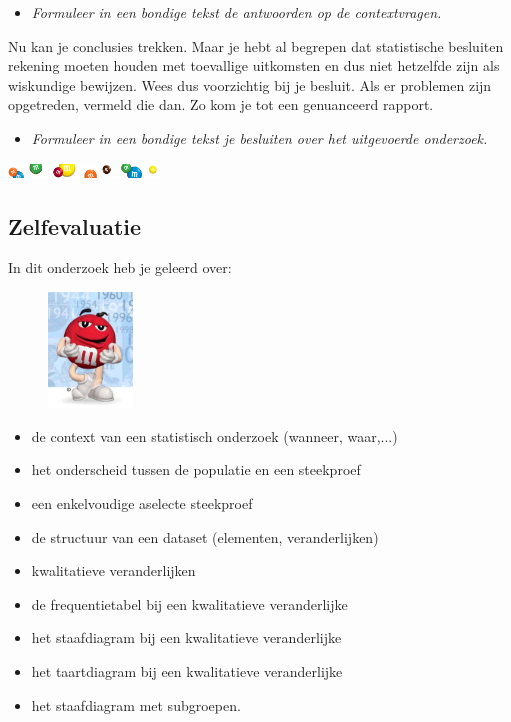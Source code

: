 \documentclass[11pt]{article}
\newcommand{\vraag}[2]{\begin{itemize}\item {\it #1} \vspace*{#2}\end{itemize}}
\begin{document}
\vraag{Formuleer in een bondige tekst de antwoorden op de contextvragen.}{4cm}

Nu kan je conclusies trekken. Maar je hebt al begrepen dat statistische besluiten rekening moeten
houden met toevallige uitkomsten en dus niet hetzelfde zijn als wiskundige bewijzen.
Wees dus voorzichtig bij je besluit. Als er problemen zijn opgetreden, vermeld die dan. Zo kom je
tot een genuanceerd rapport.

\vraag{Formuleer in een bondige tekst je besluiten over het uitgevoerde onderzoek.}{4cm}

\begin{center}
  \includegraphics[width=0.3\textwidth]{MenM-snoepjes_banner}
\end{center}

\subsection{Zelfevaluatie}
In dit onderzoek heb je geleerd over:\\
\begin{figure}
  \vspace{1cm}
  \includegraphics[width=0.2\textwidth]{MenM-zelfeval}
\end{figure}
\vspace{-1cm}
\begin{itemize}
  \item de context van een statistisch onderzoek (wanneer, waar,...)
  \item het onderscheid tussen de populatie en een steekproef
  \item een enkelvoudige aselecte steekproef
  \item de structuur van een dataset (elementen, veranderlijken)
  \item kwalitatieve veranderlijken
  \item de frequentietabel bij een kwalitatieve veranderlijke
  \item het staafdiagram bij een kwalitatieve veranderlijke
  \item het taartdiagram bij een kwalitatieve veranderlijke
  \item het staafdiagram met subgroepen.
\end{itemize}
\end{document}
